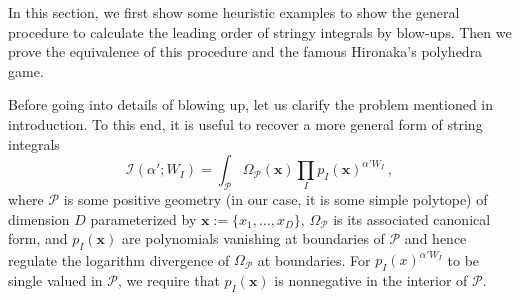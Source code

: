 \documentclass[12pt]{article}
\theoremstyle{definition}
\theoremstyle{plain}
\begin{document}
% 

In this section, we first show some heuristic examples 
to show the general procedure to calculate the leading order of stringy integrals
by blow-ups.
Then we prove the equivalence of this procedure and the famous Hironaka's polyhedra
game.

Before going into details of blowing up, let us clarify the problem mentioned in introduction. To this end, it is useful to recover a more general form of string integrals
\begin{equation*}
  \mathcal{I}(\alpha';W_{I})=\int_{\mathcal{P}} \Omega_{\mathcal{P}}(\mathbf{x}) \prod_{I}p_{I}(\mathbf{x})^{\alpha'W_{I}}\,,
\end{equation*}
where $\mathcal{P}$ is some positive geometry (in our case, it is some simple polytope) of dimension $D$ parameterized by $\mathbf{x}:= \{x_{1},\ldots,x_{D}\}$, $\Omega_{\mathcal{P}}$ is its associated canonical form, and $p_{I}(\mathbf{x})$ are polynomials vanishing at boundaries of $\mathcal{P}$ and hence regulate the logarithm divergence of $\Omega_{\mathcal{P}}$ at boundaries. For $p_{I}(x)^{\alpha' W_{I}}$ to be single valued in $\mathcal{P}$, we require that $p_{I}(\mathbf{x})$ is nonnegative in the interior of $\mathcal{P}$. %
\end{document}
